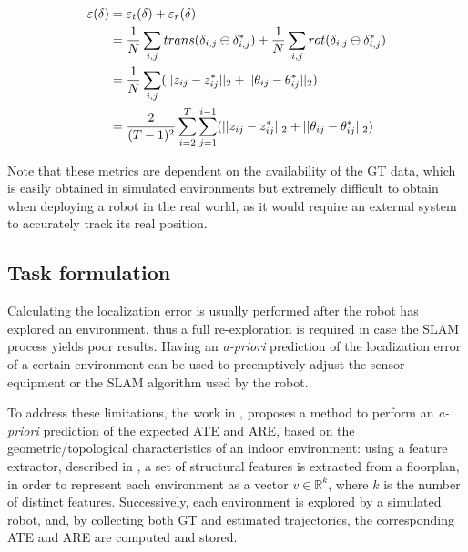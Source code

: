 \begin{equation*}
    \begin{split}
        \centering
            \varepsilon(\delta) & = \varepsilon_t(\delta) + \varepsilon_r(\delta)\\
            & = \frac{1}{N}\sum_{i, j}trans(\delta_{i,j}\ominus\delta_{i,j}^*)+\frac{1}{N}\sum_{i, j}rot(\delta_{i,j}\ominus\delta_{i,j}^*)\\
            & = \frac{1}{N}\sum_{i, j}(||z_{ij} - z_{ij}^*||_2 + ||\theta_{ij} - \theta_{ij}^*||_2) \\
            & = \frac{2}{(T-1)^2}\sum_{i=2}^T\sum_{j=1}^{i-1}(||z_{ij} - z_{ij}^*||_2 + ||\theta_{ij} - \theta_{ij}^*||_2)\\
    \end{split}
\end{equation*}

\noindent
Note that these metrics are dependent on the availability of the GT data, which is easily obtained in simulated environments but extremely difficult to obtain when deploying a robot in the real world, as it would require an external system to accurately track its real position.


\subsection{Task formulation} %
\noindent
Calculating the localization error is usually performed after the robot has explored an environment, thus a full re-exploration is required in case the SLAM process yields poor results. Having an \textit{a-priori} prediction of the localization error of a certain environment can be used to preemptively adjust the sensor equipment or the SLAM algorithm used by the robot.

To address these limitations, the work in \cite{luperto2021predicting}, proposes a method to perform an \textit{a-priori} prediction of the expected ATE and ARE, based on the geometric/topological characteristics of an indoor environment: using a feature extractor, described in \cite{luperto2019extracting}, a set of structural features is extracted from a floorplan, in order to represent each environment as a vector $v\in\mathbb{R}^k$, where $k$ is the number of distinct features.
Successively, each environment is explored by a simulated robot, and, by collecting both GT and estimated trajectories, the corresponding ATE and ARE are computed and stored.

